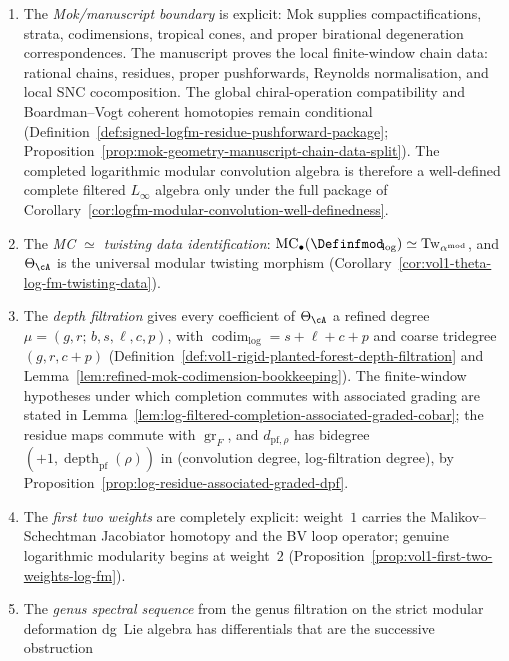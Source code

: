 \begin{summary}
\begin{enumerate}[label=\textup{(\alph*)}]
 analogues vanish (Theorem~\ref{thm:logfm-obstruction-criterion});
 the completed theorem requires strict Mittag--Leffler compatibility
 across windows.
\item The \emph{Mok/manuscript boundary} is explicit:
 Mok supplies compactifications, strata, codimensions, tropical cones,
 and proper birational degeneration correspondences. The manuscript
 proves the local finite-window chain data: rational chains, residues,
 proper pushforwards, Reynolds normalisation, and local SNC
 cocomposition. The global chiral-operation compatibility and
 Boardman--Vogt coherent homotopies remain conditional
 (Definition~\ref{def:signed-logfm-residue-pushforward-package};
 Proposition~\ref{prop:mok-geometry-manuscript-chain-data-split}).
 The completed logarithmic modular convolution algebra is therefore a
 well-defined complete filtered $L_\infty$ algebra only under the full
 package of
 Corollary~\ref{cor:logfm-modular-convolution-well-definedness}.
\item The \emph{MC $\simeq$ twisting data identification}:
 $\operatorname{MC}_\bullet({\Definfmod}_{\!\log}) \simeq
 \operatorname{Tw}_{\alpha^{\mathrm{mod}}}$, and $\Theta_\cA$ is
 the universal modular twisting morphism
 (Corollary~\ref{cor:vol1-theta-log-fm-twisting-data}).
\item The \emph{depth filtration} gives every coefficient of
 $\Theta_\cA$ a refined degree
 $\mu=(g,r;\,b,s,\ell,c,p)$, with
 $\operatorname{codim}_{\log}=s+\ell+c+p$ and coarse tridegree
 $(g,r,c+p)$
 (Definition~\ref{def:vol1-rigid-planted-forest-depth-filtration}
 and Lemma~\ref{lem:refined-mok-codimension-bookkeeping}). The
 finite-window hypotheses under which completion commutes with
 associated grading are stated in
 Lemma~\ref{lem:log-filtered-completion-associated-graded-cobar}; the
 residue maps commute with $\operatorname{gr}_F$, and
 $d_{\mathrm{pf},\rho}$ has bidegree
 $(+1,\operatorname{depth}_{\mathrm{pf}}(\rho))$ in
 \textup{(}convolution degree, log-filtration degree\textup{)}, by
 Proposition~\ref{prop:log-residue-associated-graded-dpf}.
\item The \emph{first two weights} are completely explicit:
 weight~$1$ carries the Malikov--Schechtman Jacobiator homotopy
 and the BV loop operator; genuine logarithmic modularity begins
 at weight~$2$
 (Proposition~\ref{prop:vol1-first-two-weights-log-fm}).
\item The \emph{genus spectral sequence} from the genus filtration
 on the strict modular deformation dg~Lie algebra has
 differentials that are the successive obstruction

\end{enumerate}
\end{summary}
